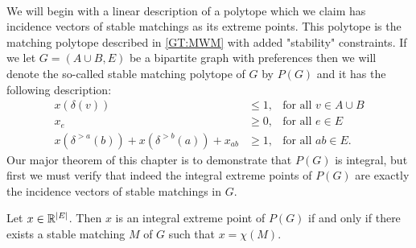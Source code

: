 \paragraph{}
We will begin with a linear description of a polytope which we claim has incidence vectors of stable matchings as its extreme points. This polytope is the matching polytope described in \ref{GT:MWM} with added "stability" constraints. If we let $G=(A\cup B, E)$ be a bipartite graph with preferences then we will denote the so-called stable matching polytope of $G$ by $P(G)$ and it has the following description:
\begin{align}
x(\delta(v)) &\leq 1, &\text{for all } v \in A\cup B \label{constraint:one}\\
x_e &\geq 0, &\text{for all } e \in E \label{constraint:nonneg}\\
x(\delta^{>a}(b)) + x(\delta^{>b}(a)) + x_{ab} &\geq 1, &\text{for all } ab \in E.\label{constraint:stab}
\end{align}
Our major theorem of this chapter is to demonstrate that $P(G)$ is integral, but first we must verify that indeed the integral extreme points of $P(G)$ are exactly the incidence vectors of stable matchings in $G$.
\begin{lemma}
Let $x \in \mathbb{R}^{\left|E\right|}$. Then $x$ is an integral extreme point of $P(G)$ if and only if there exists a stable matching $M$ of $G$ such that $x = \chi(M)$.
\end{lemma}
